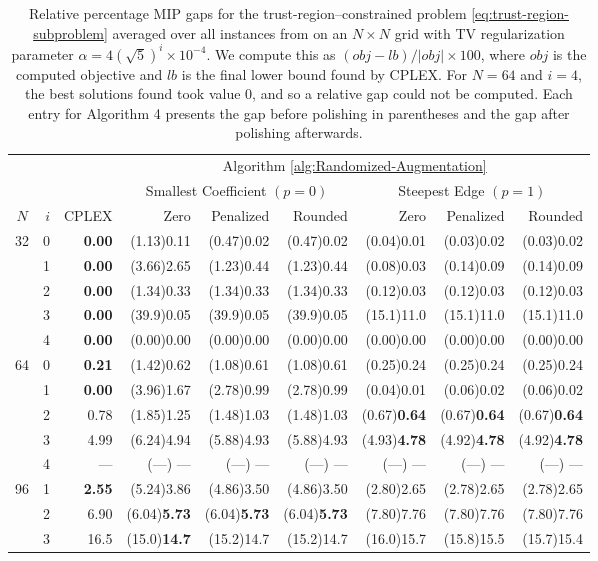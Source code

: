 \documentclass[pdflatex,sn-mathphys-num]{sn-jnl}%
\begin{document}
\begin{table}[]
    \centering
\begin{tabular}{cr|r|rrr|rrr}
 &  &       & \multicolumn{6}{c}{Algorithm \ref{alg:Randomized-Augmentation}} \\
 &  &       & \multicolumn{3}{c}{Smallest Coefficient $(p=0)$} & \multicolumn{3}{|c}{Steepest Edge $(p=1)$} \\ $N$ & $i$ & CPLEX & Zero & Penalized & Rounded & Zero & Penalized & Rounded \\
\hline
\multirow[t]{5}{*}{32} & 0 & \textbf{0.00} & (1.13)0.11 & (0.47)0.02 & (0.47)0.02 & (0.04)0.01 & (0.03)0.02 & (0.03)0.02 \\
 & 1 & \textbf{0.00} & (3.66)2.65 & (1.23)0.44 & (1.23)0.44 & (0.08)0.03 & (0.14)0.09 & (0.14)0.09 \\
 & 2 & \textbf{0.00} & (1.34)0.33 & (1.34)0.33 & (1.34)0.33 & (0.12)0.03 & (0.12)0.03 & (0.12)0.03 \\
 & 3 & \textbf{0.00} & (39.9)0.05 & (39.9)0.05 & (39.9)0.05 & (15.1)11.0 & (15.1)11.0 & (15.1)11.0 \\
 & 4 & \textbf{0.00} & (0.00)0.00 & (0.00)0.00 & (0.00)0.00 & (0.00)0.00 & (0.00)0.00 & (0.00)0.00 \\
\hline
\multirow[t]{5}{*}{64} & 0 & \textbf{0.21} & (1.42)0.62 & (1.08)0.61 & (1.08)0.61 & (0.25)0.24 & (0.25)0.24 & (0.25)0.24 \\
 & 1 & \textbf{0.00} & (3.96)1.67 & (2.78)0.99 & (2.78)0.99 & (0.04)0.01 & (0.06)0.02 & (0.06)0.02 \\
 & 2 & 0.78 & (1.85)1.25 & (1.48)1.03 & (1.48)1.03 & (0.67)\textbf{0.64} & (0.67)\textbf{0.64} & (0.67)\textbf{0.64} \\
 & 3 & 4.99 & (6.24)4.94 & (5.88)4.93 & (5.88)4.93 & (4.93)\textbf{4.78} & (4.92)\textbf{4.78} & (4.92)\textbf{4.78} \\
 & 4 & --- & (---) --- & (---) --- & (---) --- & (---) --- & (---) --- & (---) --- \\
\hline
\multirow[t]{3}{*}{96} & 1 & \textbf{2.55} & (5.24)3.86 & (4.86)3.50 & (4.86)3.50 & (2.80)2.65 & (2.78)2.65 & (2.78)2.65 \\
 & 2 & 6.90 & (6.04)\textbf{5.73} & (6.04)\textbf{5.73} & (6.04)\textbf{5.73} & (7.80)7.76 & (7.80)7.76 & (7.80)7.76 \\
 & 3 & 16.5 & (15.0)\textbf{14.7} & (15.2)14.7 & (15.2)14.7 & (16.0)15.7 & (15.8)15.5 & (15.7)15.4 \\

\end{tabular}
    \caption{Relative percentage MIP gaps for the trust-region--constrained problem \eqref{eq:trust-region-subproblem} averaged over all instances from \cite{manns2024discrete} on an $N\times N$ grid with TV regularization parameter $\alpha = 4(\sqrt{5})^i \times 10^{-4}$. We compute this as $(obj - lb)/|obj| \times 100$, where $obj$ is the computed objective and $lb$ is the final lower bound found by CPLEX. For $N=64$ and $i = 4$, the best solutions found took value 0, and so a relative gap could not be computed. Each entry for Algorithm 4 presents the gap before polishing in parentheses and the gap after polishing afterwards.}
    \label{tab:trust-region-gaps}
\end{table}
\end{document}
